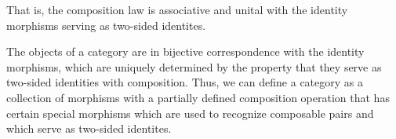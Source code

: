 \documentclass[12pt]{report}
\begin{document}
\begin{defn}{}{}
\begin{enumerate}
\begin{center}
\begin{tikzpicture}[x=0.75pt,y=0.75pt,yscale=-1,xscale=1]
\end{tikzpicture} 
            \end{center}
    \end{enumerate}
    That is, the composition law is associative and unital with the identity morphisms serving as two-sided identites.
\end{defn}

\begin{rmk}{}{}
    The objects of a category are in bijective correspondence with the identity morphisms, which are uniquely determined by the property that they serve as two-sided identities with composition. Thus, we can define a category as a collection of morphisms with a partially defined composition operation that has certain special morphisms which are used to recognize composable pairs and which serve as two-sided identites. 
\end{rmk}
\end{document}
